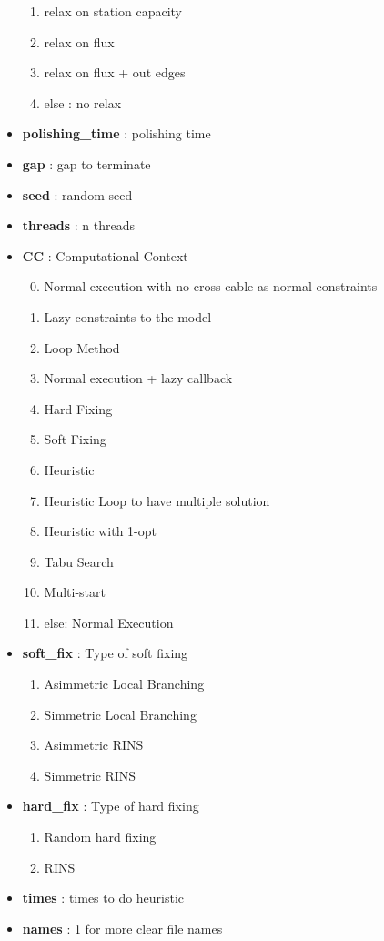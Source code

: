 \begin{appendices}
\begin{itemize}
\begin{enumerate}
	\item relax on station capacity
	\item relax on flux
	\item relax on flux + out edges
	\item[] else : no relax
\end{enumerate}
\item \textbf{polishing\_time} : polishing time
\item \textbf{gap} : gap to terminate
\item \textbf{seed} : random seed
\item \textbf{threads} : n threads
\item \textbf{CC} : Computational Context
\begin{enumerate}\setcounter{enumi}{-1}
\setlength{\parskip}{0pt}
\setlength{\itemsep}{0pt plus 1pt}
	\item Normal execution with no cross cable as normal constraints
	\item Lazy constraints to the model
	\item Loop Method
	\item Normal execution + lazy callback
	\item Hard Fixing
	\item Soft Fixing
	\item Heuristic
	\item Heuristic Loop to have multiple solution
	\item Heuristic with 1-opt
	\item Tabu Search
	\item Multi-start
	\item[] else: Normal Execution
\end{enumerate}
\item \textbf{soft\_fix} : Type of soft fixing
\begin{enumerate}\setcounter{enumi}{0}
\setlength{\parskip}{0pt}
\setlength{\itemsep}{0pt plus 1pt}
	\item Asimmetric Local Branching
	\item Simmetric Local Branching
	\item Asimmetric RINS
	\item Simmetric RINS
\end{enumerate}
\item \textbf{hard\_fix} : Type of hard fixing
\begin{enumerate}\setcounter{enumi}{0}
\setlength{\parskip}{0pt}
\setlength{\itemsep}{0pt plus 1pt}
	\item Random hard fixing
	\item RINS
\end{enumerate}
\item \textbf{times} : times to do heuristic
\item \textbf{names} : 1 for more clear file names
\end{itemize}


\end{appendices}
